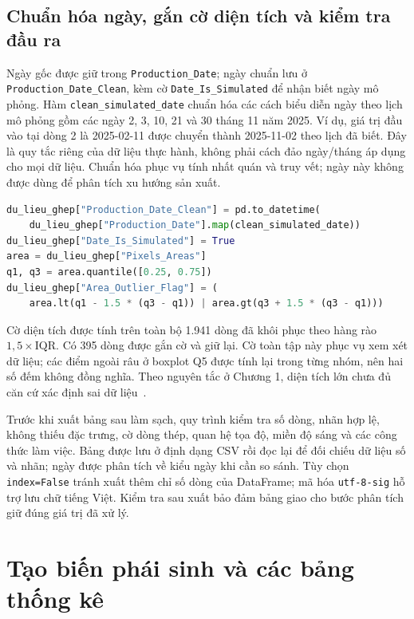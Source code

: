 \documentclass[12pt,a4paper,oneside]{report}
\newcommand{\maCot}[1]{{\urlstyle{tt}\def\UrlBreaks{\do\_\do\/\do\.}\def\UrlBigBreaks{}\nolinkurl{#1}}}
\begin{document}
\subsection{Chuẩn hóa ngày, gắn cờ diện tích và kiểm tra đầu ra}

Ngày gốc được giữ trong \maCot{Production_Date}; ngày chuẩn lưu ở \maCot{Production_Date_Clean}, kèm cờ \maCot{Date_Is_Simulated} để nhận biết ngày mô phỏng. Hàm \maCot{clean_simulated_date} chuẩn hóa các cách biểu diễn ngày theo lịch mô phỏng gồm các ngày 2, 3, 10, 21 và 30 tháng 11 năm 2025. Ví dụ, giá trị đầu vào tại dòng 2 là 2025-02-11 được chuyển thành 2025-11-02 theo lịch đã biết. Đây là quy tắc riêng của dữ liệu thực hành, không phải cách đảo ngày/tháng áp dụng cho mọi dữ liệu. Chuẩn hóa phục vụ tính nhất quán và truy vết; ngày này không được dùng để phân tích xu hướng sản xuất.

\noindent\begin{minipage}{\linewidth}
\begin{lstlisting}[language=Python]
du_lieu_ghep["Production_Date_Clean"] = pd.to_datetime(
    du_lieu_ghep["Production_Date"].map(clean_simulated_date))
du_lieu_ghep["Date_Is_Simulated"] = True
area = du_lieu_ghep["Pixels_Areas"]
q1, q3 = area.quantile([0.25, 0.75])
du_lieu_ghep["Area_Outlier_Flag"] = (
    area.lt(q1 - 1.5 * (q3 - q1)) | area.gt(q3 + 1.5 * (q3 - q1)))
\end{lstlisting}
\end{minipage}\par

Cờ diện tích được tính trên toàn bộ 1.941 dòng đã khôi phục theo hàng rào $1{,}5\times\mathrm{IQR}$. Có 395 dòng được gắn cờ và giữ lại. Cờ toàn tập này phục vụ xem xét dữ liệu; các điểm ngoài râu ở boxplot Q5 được tính lại trong từng nhóm, nên hai số đếm không đồng nghĩa. Theo nguyên tắc ở Chương 1, diện tích lớn chưa đủ căn cứ xác định sai dữ liệu~\cite{nistbox}.

Trước khi xuất bảng sau làm sạch, quy trình kiểm tra số dòng, nhãn hợp lệ, không thiếu đặc trưng, cờ dòng thép, quan hệ tọa độ, miền độ sáng và các công thức làm việc. Bảng được lưu ở định dạng CSV rồi đọc lại để đối chiếu dữ liệu số và nhãn; ngày được phân tích về kiểu ngày khi cần so sánh. Tùy chọn \maCot{index=False} tránh xuất thêm chỉ số dòng của DataFrame; mã hóa \maCot{utf-8-sig} hỗ trợ lưu chữ tiếng Việt. Kiểm tra sau xuất bảo đảm bảng giao cho bước phân tích giữ đúng giá trị đã xử lý.

\section{Tạo biến phái sinh và các bảng thống kê}
\end{document}
